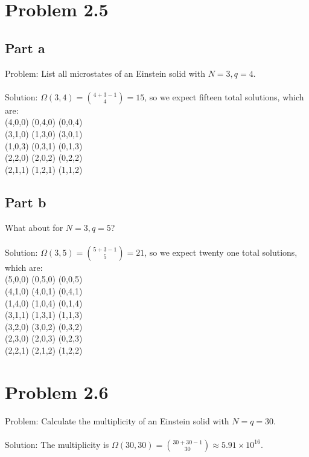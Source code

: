 \documentclass[paper=a4, fontsize=11pt]{scrartcl} %
\numberwithin{equation}{section} %
\numberwithin{figure}{section} %
\numberwithin{table}{section} %
\begin{document}
\section*{Problem 2.5}
\subsection*{Part a}
Problem: List all microstates of an Einstein solid with $N=3,q=4$.
\\
\\
Solution: $\Omega(3,4) = \binom{4+3-1}{4} = 15$, so we expect fifteen total solutions,
which are:
\\
(4,0,0)
(0,4,0)
(0,0,4)\\
(3,1,0)
(1,3,0)
(3,0,1)\\
(1,0,3)
(0,3,1)
(0,1,3)\\
(2,2,0)
(2,0,2)
(0,2,2)\\
(2,1,1)
(1,2,1)
(1,1,2)\\

\subsection*{Part b}
What about for $N=3,q=5$?
\\
\\
Solution: $\Omega(3,5) = \binom{5+3-1}{5} = 21$, so we expect twenty one total solutions,
which are:
\\
(5,0,0)
(0,5,0)
(0,0,5)\\
(4,1,0)
(4,0,1)
(0,4,1)\\
(1,4,0)
(1,0,4)
(0,1,4)\\
(3,1,1)
(1,3,1)
(1,1,3)\\
(3,2,0)
(3,0,2)
(0,3,2)\\
(2,3,0)
(2,0,3)
(0,2,3)\\
(2,2,1)
(2,1,2)
(1,2,2)

\section*{Problem 2.6}
Problem: Calculate the multiplicity of an Einstein solid with $N=q=30$.
\\
\\
Solution: The multiplicity is $\Omega (30,30) = \binom{30+30-1}{30} \approx 5.91\times 10^{16}$.
\end{document}
